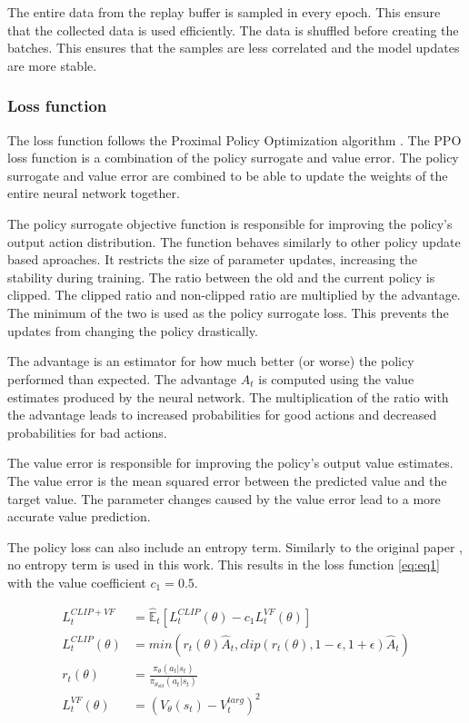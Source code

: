 The entire data from the replay buffer is sampled in every epoch. This ensure that the collected data is used efficiently. The data is shuffled before creating the batches. This ensures that the samples are less correlated and the model updates are more stable.

\subsubsection*{Loss function}

The loss function follows the Proximal Policy Optimization algorithm \textcite{ppo}. The PPO loss function is a combination of the policy surrogate and value error. The policy surrogate and value error are combined to be able to update the weights of the entire neural network together.

The policy surrogate objective function is responsible for improving the policy's output action distribution. The function behaves similarly to other policy update based aproaches. It restricts the size of parameter updates, increasing the stability during training. The ratio between the old and the current policy is clipped. The clipped ratio and non-clipped ratio are multiplied by the advantage. The minimum of the two is used as the policy surrogate loss. This prevents the updates from changing the policy drastically.

The advantage is an estimator for how much better (or worse) the policy performed than expected. The advantage $\hat{A}_t$ is computed using the value estimates produced by the neural network. The multiplication of the ratio with the advantage leads to increased probabilities for good actions and decreased probabilities for bad actions.

The value error is responsible for improving the policy's output value estimates. The value error is the mean squared error between the predicted value and the target value. The parameter changes caused by the value error lead to a more accurate value prediction.

The policy loss can also include an entropy term. Similarly to the original paper \textcite{ppo}, no entropy term is used in this work. This results in the loss function \eqref{eq:eq1} with the value coefficient $c_1 = 0.5$.

\begin{align*}
    L_t^{CLIP + VF} &= \hat{\mathbb{E}}_t [L_t^{CLIP}(\theta) - c_1 L_t^{VF}(\theta)] \label{eq:eq1}\tag{PPO Loss} \\
    L_t^{CLIP}(\theta) &= min(r_t(\theta)\hat{A}_t, clip(r_t(\theta), 1-\epsilon, 1+\epsilon)\hat{A}_t) \label{eq:eq2}\tag{Surrogate Objective}\\
    r_t(\theta) &= \frac{\pi_\theta(a_t|s_t)}{\pi_{\theta_{old}}(a_t|s_t)} \label{eq:eq3}\tag{Ratio}\\
    L_t^{VF}(\theta) &= (V_\theta (s_t) - V_t^{targ})^2 \label{eq:eq4}\tag{Value Error}
\end{align*}

